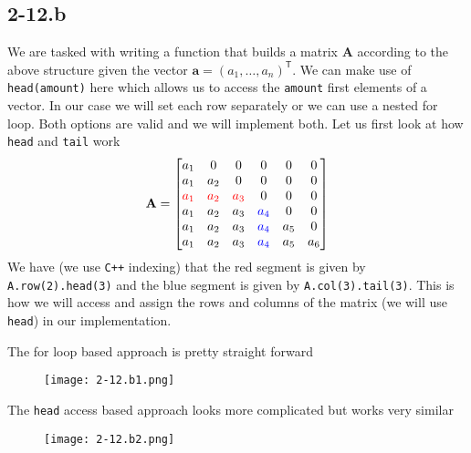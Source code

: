 \documentclass{article}
\begin{document}
\subsection*{2-12.b}
We are tasked with writing a function that builds a matrix $\mathbf{A}$ according to the above structure given the vector $\mathbf{a} = \left(a_{1}, \dots, a_{n}\right)^{\mathsf{T}}$. We can make use of \verb|head(amount)| here which allows us to access the \verb|amount| first elements of a vector. In our case we will set each row separately or we can use a nested for loop. Both options are valid and we will implement both. Let us first look at how \verb|head| and \verb|tail| work
\begin{equation*}
\mathbf{A} = 
    \begin{bmatrix}
        a_{1} & 0 & 0 & 0 & 0 & 0 \\
        a_{1} & a_{2} & 0 & 0 & 0 & 0 \\
        \color{red}a_{1}\color{black} & \color{red}a_{2}\color{black} & \color{red}a_{3}\color{black} & 0 & 0 & 0 \\
        a_{1} & a_{2} & a_{3} & \color{blue}a_{4}\color{black} & 0 & 0 \\
        a_{1} & a_{2} & a_{3} & \color{blue}a_{4}\color{black} & a_{5} & 0 \\
        a_{1} & a_{2} & a_{3} & \color{blue}a_{4}\color{black} & a_{5} & a_{6} \\
    \end{bmatrix} 
\end{equation*}
We have (we use \verb|C++| indexing) that the red segment is given by \color{red}\verb|A.row(2).head(3)|\color{black} and the blue segment is given by \color{blue}\verb|A.col(3).tail(3)|\color{black}. This is how we will access and assign the rows and columns of the matrix (we will use \verb|head|) in our implementation.

\pagebreak

\noindent The for loop based approach is pretty straight forward
\begin{figure}[!hbt]
    \centering
\texttt{[image: 2-12.b1.png]}
\end{figure}

\noindent The \verb|head| access based approach looks more complicated but works very similar

\begin{figure}[!hbt]
    \centering
\texttt{[image: 2-12.b2.png]}
\end{figure}
\end{document}
